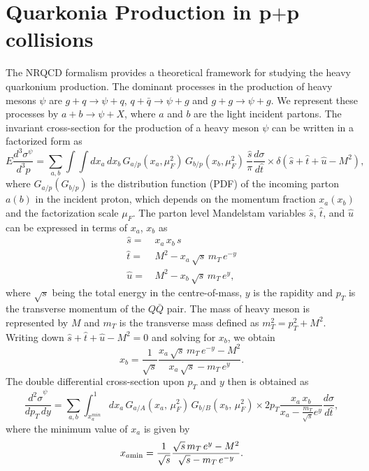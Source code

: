 \documentclass[12pt,a4paper,final]{iopart}
\newcommand{\cs}{{\hat{s}}}
\newcommand{\ct}{{\hat{t}}}
\newcommand{\cu}{{\hat{u}}}
\begin{document}
\section{Quarkonia Production in p$+$p collisions}
\label{section:ppProduction}
 The NRQCD formalism provides a theoretical framework for studying the heavy 
quarkonium production. The dominant processes in the production of heavy 
mesons $\psi$ are $g+q\rightarrow \psi+q$, $q+\bar{q}\rightarrow \psi+g$ and 
$g+g\rightarrow \psi+g$. We represent these processes by $a+b\rightarrow \psi+X$, 
where $a$ and $b$ are the light incident partons. The invariant cross-section 
for the production of a heavy meson $\psi$ can be written in a factorized form as 
\begin{equation}
    E\frac{d^{3}\sigma^{\psi}}{d^{3}p} = \sum_{a,b}\int \int dx_a\,dx_b \, 
    G_{a/p}(x_a,\mu_{F}^{2}) \, G_{b/p}(x_b,\mu_{F}^{2}) \, \frac{\hat s}{\pi}\frac{d\sigma}{d\hat t}
    \times \delta(\hat s + \hat t + \hat u -M^{2}), 
\label{eqn:cross}
\end{equation}
where $G_{a/p}(G_{b/p})$ is the distribution function (PDF) of the incoming parton 
$a(b)$ in the incident proton, which depends on the momentum fraction $x_a(x_b)$
and the factorization scale $\mu_F$. The parton level  Mandelstam variables 
${\hat s}$, ${\hat t}$, and ${\hat u}$
can be expressed in terms of $x_a$, $x_b$ as 
\begin{equation}
\begin{split}
\cs = \,& x_{a}\,x_{b}\,s \\
\ct = \,& M^{2} - x_{a}\,\sqrt{s}\,m_{T}\,e^{-y}\\
\cu = \,& M^{2} - x_{b}\,\sqrt{s}\,m_{T}\,e^{y} ,
\end{split}  
\end{equation}
where $\sqrt{s}$ being the total energy in the centre-of-mass, $y$ is the rapidity 
and $p_{T}$ is the transverse momentum of the $Q\bar Q$ pair. The mass of heavy
meson is represented by $M$ and $m_{T}$ is the transverse mass 
defined as $m_{T}^{2} = p_{T}^{2} + M^{2}$. Writing 
down $ \hat s + \hat t + \hat u -M^{2} = 0$ and solving for $x_{b}$, we obtain
\begin{equation}
x_b = \frac{1}{\sqrt{s}}\frac{x_a\,\sqrt{s}\,m_T\,e^{-y}-M^2}{x_a\,\sqrt{s}-m_T\,e^y}.
\end{equation}
 The double differential cross-section upon $p_{T}$ and $y$ then is obtained as
\begin{equation}
\frac{{d^{2}\sigma}^{\psi}}{dp_T\,dy} = \sum_{a,b}\int_{x_{a}^{min}}^{1} dx_a\, 
           G_{a/A}(x_a,\,\mu^{2}_{F})\, G_{b/B}(x_b,\,\mu^{2}_{F})\times 
            2p_T \frac{x_a\,x_b}{x_a-\frac{m_T}{\sqrt{s}}e^y}\frac{d\sigma}{d\hat t},
\end{equation}
where the minimum value of $x_a$ is given by
\begin{equation}
x_{a\rm min} = \frac{1}{\sqrt{s}}\frac{\sqrt{s}\,m_T\,e^{y}-M^2}{\sqrt{s}-m_T\,e^{-y}}.
\end{equation}
\end{document}
